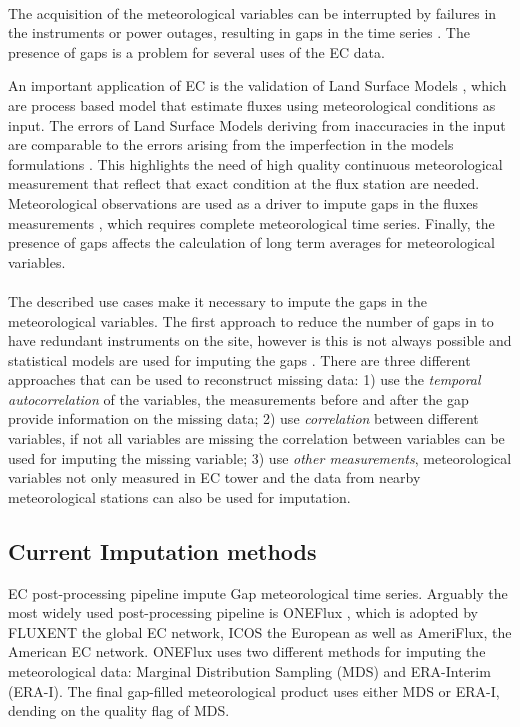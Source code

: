 \documentclass{article}
\let\Oldsubsection\subsection
\renewcommand{\subsection}{\FloatBarrier\Oldsubsection}
\begin{document}
\paragraph{} The acquisition of the meteorological variables can be interrupted by failures in the instruments or power outages, resulting in gaps in the time series \cite{aubinet_eddy_2012-1}.
The presence of gaps is a problem for several uses of the EC data.

An important application of EC is the validation of Land Surface Models \cite{balzarolo_evaluating_2014, friend_fluxnet_2007-1, bonan_improving_2011-1, kramer_evaluation_2002}, which are process based model that estimate fluxes using meteorological conditions as input. The errors of Land Surface Models deriving from inaccuracies in the input are comparable to the errors arising from the imperfection in the models formulations \cite{zhao_how_2012}. This highlights the need of high quality continuous meteorological measurement that reflect that exact condition at the flux station are needed.
Meteorological observations are used as a driver to impute gaps in the fluxes measurements \cite{aubinet_eddy_2012-1}, which requires complete meteorological time series.
Finally, the presence of gaps affects the calculation of long term averages for meteorological variables. 

\paragraph{} The described use cases make it necessary to impute the gaps in the meteorological variables. The first approach to reduce the number of gaps in to have redundant instruments on the site, however is this is not always possible and statistical models are used for imputing the gaps \cite{aubinet_eddy_2012-1}. There are three different approaches that can be used to reconstruct missing data: 1) use the \emph{temporal autocorrelation} of the variables, the measurements  before and after the gap provide information on the missing data; 2) use \emph{correlation} between different variables, if not all variables are missing the correlation between variables can be used for imputing the missing variable; 3) use \emph{other measurements}, meteorological variables not only measured in EC tower and the data from nearby meteorological stations can also be used for imputation.


\subsection{Current Imputation methods} EC post-processing pipeline impute Gap meteorological time series. Arguably the most widely used post-processing pipeline is ONEFlux \cite{pastorello_fluxnet2015_2020}, which is adopted by FLUXENT the global EC network, ICOS the European as well as AmeriFlux, the American EC network.
ONEFlux uses two different methods for imputing the meteorological data: Marginal Distribution Sampling (MDS) and ERA-Interim (ERA-I). The final gap-filled meteorological product uses either MDS or ERA-I, dending on the quality flag of MDS.
\end{document}
